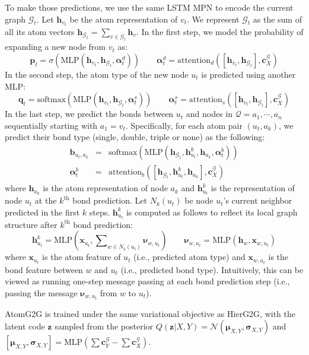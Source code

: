 \documentclass{article} \usepackage{iclr2020_conference,times}
\newcommand{\graph}{\mathcal{G}}
\newcommand{\MLP}{\mathrm{MLP}}
\newcommand{\attention}{\mathrm{attention}}
\def\vmu{{\bm{\mu}}}
\def\vnu{{\bm{\nu}}}
\def\valpha{{\bm{\alpha}}}
\def\vsigma{{\bm{\sigma}}}
\def\vb{{\bm{b}}}
\def\vc{{\bm{c}}}
\def\vh{{\bm{h}}}
\def\vp{{\bm{p}}}
\def\vq{{\bm{q}}}
\def\vx{{\bm{x}}}
\def\vz{{\bm{z}}}
\def\gN{{\mathcal{N}}}
\def\gQ{{\mathcal{Q}}}
\newcommand{\softmax}{\mathrm{softmax}}
\newcommand{\sigmoid}{\sigma}
\begin{document}
To make those predictions, we use the same LSTM MPN to encode the current graph $\graph_t$. Let $\vh_{v_t}$ be the atom representation of $v_t$. We represent $\graph_t$ as the sum of all its atom vectors $\vh_{\graph_t} = \sum_{v \in \graph_t} \vh_v$. In the first step, we model the probability of expanding a new node from $v_t$ as:
\begin{equation}
    \vp_t = \sigmoid(\MLP(\vh_{v_t}, \vh_{\graph_t}, \valpha_t^d)) \qquad \valpha_t^d = \attention_d\left( [\vh_{v_t},\vh_{\graph_t}], \vc_X^\graph \right)
\end{equation}
In the second step, the atom type of the new node $u_t$ is predicted using another MLP:
\begin{equation}
    \vq_t = \softmax(\MLP(\vh_{v_t}, \vh_{\graph_t}, \valpha_t^s)) \qquad \valpha_t^s = \attention_s\left( [\vh_{v_t},\vh_{\graph_t}], \vc_X^\graph \right)
\end{equation}
In the last step, we predict the bonds between $u_t$ and nodes in $\gQ={a_1,\cdots,a_n}$ sequentially starting with $a_1=v_t$. Specifically, for each atom pair $(u_t,a_k)$, we predict their bond type (single, double, triple or none) as the following:
\begin{eqnarray}
    \vb_{u_t, a_k} &=& \softmax( \MLP(\vh_{\graph_t}, \vh_{u_t}^k, \vh_{a_k}, \valpha_t^b) ) \\ 
    \valpha_t^b &=& \attention_b \left( [\vh_{\graph_t}, \vh_{u_t}^k, \vh_{a_k}], \vc_X^\graph \right)
\end{eqnarray}
where $\vh_{a_k}$ is the atom representation of node $a_k$ and $\vh_{u_t}^k$ is the representation of node $u_t$ at the $k^{\textrm{th}}$ bond prediction. Let $N_k(u_t)$ be node $u_t$'s current neighbor predicted in the first $k$ steps. $\vh_{u_t}^k$ is computed as follows to reflect its local graph structure after $k^{\textrm{th}}$ bond prediction:
\begin{equation}
    \vh_{u_t}^k = \MLP\left(\vx_{u_t}, \sum\nolimits_{w \in N_k(u_t)} \vnu_{w,u_t} \right) \qquad \vnu_{w,u_t} = \MLP(\vh_w, \vx_{w,u_t})
\end{equation}
where $\vx_{u_t}$ is the atom feature of $u_t$ (i.e., predicted atom type) and $\vx_{w,u_t}$ is the bond feature between $w$ and $u_t$ (i.e., predicted bond type). Intuitively, this can be viewed as running one-step message passing at each bond prediction step (i.e., passing the message $\vnu_{w,u_t}$ from $w$ to $u_t$).

AtomG2G is trained under the same variational objective as HierG2G, with the latent code $\vz$ sampled from the posterior $Q(\vz | X, Y)=\gN(\vmu_{X,Y}, \vsigma_{X,Y})$ and $[\vmu_{X,Y}, \vsigma_{X,Y}] = \MLP(\sum \vc_Y^\graph - \sum \vc_X^\graph)$. 
\end{document}
